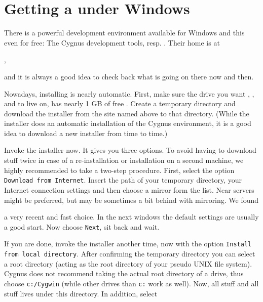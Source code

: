 \section{Getting  a  under Windows}

There is a powerful development environment available for Windows and this even for free:
The Cygnus development tools, resp. \Cygwin. Their home
is at
 \medskip

,
 \medskip

 \noindent
and it is always a good idea to check back what is going on there now and then.

Nowadays, installing \Cygwin{} is nearly automatic. First, make sure
the drive you want \Cygwin{}, \PLIB{}, \SimGear{} and \FlightGear{} to live on, has
nearly 1 GB of free . Create a temporary directory and download the
installer from the site named above to that directory. (While the installer does an
automatic installation of the Cygnus environment, it is a good idea to download a new
installer from time to time.)

Invoke the installer now. It gives you three options. To avoid having to download stuff
twice in case of a re-installation or installation on a second machine, we highly
recommended to take a two-step procedure. First, select the option \texttt{Download from
Internet}. Insert the path of your temporary directory, your Internet connection settings
and then choose a mirror form the list. Near servers might be preferred, but may be
sometimes a bit behind with mirroring. We found
\medskip

\medskip

 \noindent
a very recent and fast choice. In the next windows the default settings are usually a
good start. Now choose \texttt{Next}, sit back and wait.

If you are done, invoke the installer another time, now with the option
\texttt{Install from local directory}. After confirming the temporary directory you can
select a root directory (acting as the root directory of your pseudo UNIX file system).
Cygnus does not recommend taking the actual root directory of a drive, thus choose
\texttt{c:/Cygwin} (while other drives than \texttt{c:} work as well). Now, all \Cygwin{} stuff and all \FlightGear{} stuff lives under this directory. In addition, select

